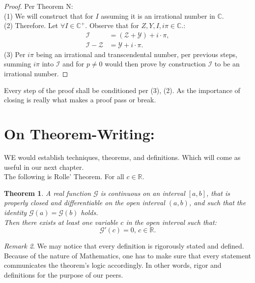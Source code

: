 \documentclass[10pt]{article}
\theoremstyle{plain}
\newtheorem{theorem}{Theorem}[section]
\theoremstyle{definition}
\theoremstyle{remark}
\newtheorem{remark}[theorem]{Remark}
\begin{document}
\begin{proof}
	Per Theorem N:\\
	(1) We will construct that for $I$ assuming it is an irrational number in $\mathbb{C}$.\\
	(2) Therefore. Let $\forall I \in \mathbb{C}^{+}.$ Observe that for $Z, Y, I, i\pi \in \mathbb{C}.$:
	\begin{align*}
		\mathcal{I} &= (\mathcal{Z}+\mathcal{Y})+i \cdot \pi,\\
		\mathcal{I}-\mathcal{Z} &= \mathcal{Y}+i \cdot \pi.
	\end{align*}
	(3) Per $i\pi$ being an irrational and transcendental number, per previous steps, summing $i\pi$ into $\mathcal{I}$ and for $p \neq 0$ would then prove by construction $\mathcal{I}$ to be an irrational number.
\end{proof}
Every step of the proof shall be conditioned per (3), (2). As the importance of closing is really what makes a proof pass or break.

\section{On Theorem-Writing:}

\lettrine[lines=2, lhang=0.1, loversize=0.2]{W}E would establish techniques, theorems, and definitions. Which will come as useful in our next chapter.\\
The following is Rolle' Theorem. For all $c \in \mathbb{R}.$

\begin{theorem}
	A real function $\mathcal{G}$ is continuous on an interval $[a, b]$, that is properly closed and differentiable on the open interval $(a, b)$, and such that the identity $\mathcal{G}(a) = \mathcal{G}(b)$ holds.\\Then there exists at least one variable $c$ in the open interval such that:
	\begin{equation}
		\mathcal{G}'(c) = 0, \, c \in \mathbb{R}.
	\end{equation}
\end{theorem}

\begin{remark}
We may notice that every definition is rigorously stated and defined. Because of the nature of Mathematics, one has to make sure that every statement communicates the theorem's logic accordingly. In other words, rigor and definitions for the purpose of our peers.
\end{remark}
\end{document}
